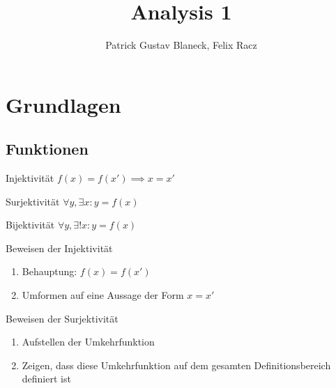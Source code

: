 \documentclass[german]{../spicker}
\title{Analysis 1}
\author{Patrick Gustav Blaneck, Felix Racz}
\begin{document}
\maketitle
\tableofcontents
\newpage


\section{Grundlagen}

\subsection{Funktionen}

\begin{thirdboxl}
    \begin{defi}{Injektivität}
        $f(x) = f(x')\implies x = x'$
    \end{defi}
\end{thirdboxl}%
\begin{thirdboxm}
    \begin{defi}{Surjektivität}
        $\forall y, \exists x: y = f(x)$
    \end{defi}
\end{thirdboxm}%
\begin{thirdboxr}
    \begin{defi}{Bijektivität}
        $\forall y, \exists! x: y = f(x)$
    \end{defi}
\end{thirdboxr}%

\begin{algo}{Beweisen der Injektivität}
    \begin{enumerate}
        \item Behauptung: $f(x) = f(x')$
        \item Umformen auf eine Aussage der Form $x = x'$
    \end{enumerate}
\end{algo}

\begin{algo}{Beweisen der Surjektivität}
    \begin{enumerate}
        \item Aufstellen der Umkehrfunktion
        \item Zeigen, dass diese Umkehrfunktion auf dem gesamten Definitionsbereich definiert ist
    \end{enumerate}
\end{algo}
\end{document}
